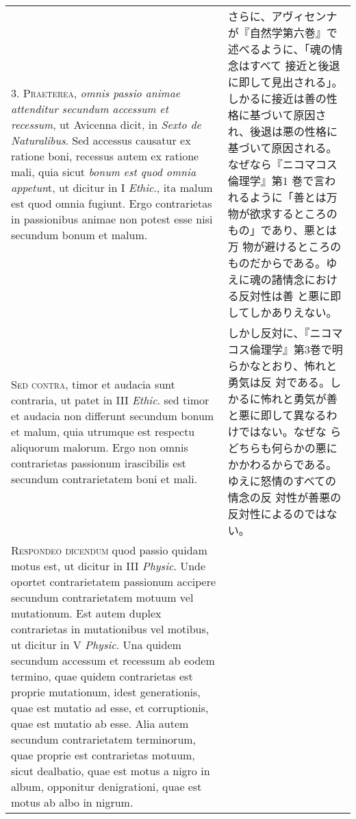 \documentclass[10pt]{jsarticle} %
\begin{document}
\begin{longtable}{p{21em}p{21em}}
3. {\scshape Praeterea}, {\itshape omnis passio animae attenditur secundum accessum et recessum},
ut Avicenna dicit, in {\itshape Sexto de Naturalibus}. Sed accessus causatur ex
ratione boni, recessus autem ex ratione mali, quia sicut {\itshape bonum est quod
omnia appetun}t, ut dicitur in I {\itshape Ethic}., ita malum est quod omnia
fugiunt. Ergo contrarietas in passionibus animae non potest esse nisi
secundum bonum et malum.


&

さらに、アヴィセンナが『自然学第六巻』で述べるように、「魂の情念はすべて
 接近と後退に即して見出される」。しかるに接近は善の性格に基づいて原因さ
 れ、後退は悪の性格に基づいて原因される。なぜなら『ニコマコス倫理学』第1
 巻で言われるように「善とは万物が欲求するところのもの」であり、悪とは万
 物が避けるところのものだからである。ゆえに魂の諸情念における反対性は善
 と悪に即してしかありえない。


\\



{\scshape Sed contra}, timor et audacia sunt contraria, ut patet in III {\itshape Ethic}. sed
timor et audacia non differunt secundum bonum et malum, quia utrumque
est respectu aliquorum malorum. Ergo non omnis contrarietas passionum
irascibilis est secundum contrarietatem boni et mali.


&

しかし反対に、『ニコマコス倫理学』第3巻で明らかなとおり、怖れと勇気は反
 対である。しかるに怖れと勇気が善と悪に即して異なるわけではない。なぜな
 らどちらも何らかの悪にかかわるからである。ゆえに怒情のすべての情念の反
 対性が善悪の反対性によるのではない。

\\



{\scshape Respondeo dicendum} quod passio quidam motus est, ut dicitur in III
{\itshape Physic}. Unde oportet contrarietatem passionum accipere secundum
contrarietatem motuum vel mutationum. Est autem duplex contrarietas in
mutationibus vel motibus, ut dicitur in V {\itshape Physic}. Una quidem secundum
accessum et recessum ab eodem termino, quae quidem contrarietas est
proprie mutationum, idest generationis, quae est mutatio ad esse, et
corruptionis, quae est mutatio ab esse. Alia autem secundum
contrarietatem terminorum, quae proprie est contrarietas motuum, sicut
dealbatio, quae est motus a nigro in album, opponitur denigrationi, quae
est motus ab albo in nigrum. 

&


\end{longtable}
\end{document}
